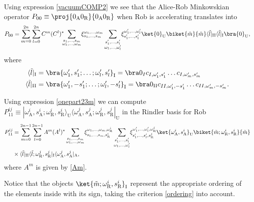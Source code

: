 Using expression \eqref{vacuumCOMP2} we see that the Alice-Rob Minkowskian operator $P_{00}\equiv\proj{0_\text{A}0_\text{R}}{0_\text{A}0_\text{R}}$ when Rob is accelerating translates into
\begin{equation}\label{0000}
 P_{00}=\sum_{m=0}^{2n}\sum_{l=0}^{2n}C^m (C^{l})^*\!\!\!\sum_{\substack{s_1,\dots,s_m\\\omega_1,\dots,\omega_m}}\!\xi_{s_1,\dots,s_m}^{\omega_1,\dots,\omega_m}\sum_{\substack{s'_1,\dots,s'_{l}\\\omega_1,\dots,\omega'_{l}}}\!\xi_{s'_1,\dots,s'_l}^{\omega'_1,\dots,\omega'_l}\ket{0}_{\text{U}}\biket{\tilde m}{\tilde m}\langle{\tilde l}|_{\text{II}}\langle{\tilde l}|_{\text{I}}\bra{0}_{\text{U}},
\end{equation}
where
\begin{align}
\nonumber\langle{\tilde l}|_{\text{I}}&=\bra{\omega'_1,s'_1;\dots; \omega'_l,s'_l}_\text{I}=\bra0_I c_{I,\omega'_1,s'_1}\dots c_{I,\omega'_m,s'_m}\\*
\langle{\tilde l}|_{\text{II}}&=\bra{\omega'_1,-s'_1;\dots; \omega'_l,-s'_l}_\text{I}=\bra0_{\text{II}} c_{II,\omega'_1,-s'_1}\dots c_{II,\omega'_m,-s'_m}.
\end{align}

Using expression \eqref{onepart23m} we can compute $P_{11}^{ij}\equiv | \omega^i_\text{A},s^i_\text{A};\omega^i_\text{R},s^i_\text{R}\rangle_\text{U}\langle \omega^j_\text{A},s^j_\text{A};\omega^j_\text{R},s^j_\text{R}|_\text{U}$ in the Rindler basis for Rob
\begin{align}\label{1111}
 \nonumber P_{11}^{ij}&=\sum_{m=0}^{2n-1}\sum_{l=0}^{2n-1}A^m(A^l)^*\sum_{\substack{s_1,\dots,s_m\\\omega_1,\dots,\omega_m}}\!\xi_{s_1,\dots,s_m,s^i_\text{R}}^{\omega_1,\dots,\omega_m,\omega^i_\text{R}}\sum_{\substack{s'_1,\dots,s'_{l}\\\omega_1,\dots,\omega'_{l}}}\!\xi_{s'_1,\dots,s'_l,s^j_\text{R}}^{\omega'_1,\dots,\omega'_l,\omega^j_\text{R}} \ket{\omega^i_\text{A},s^i_\text{A}}_{\text{U}}\biket{\tilde m;\omega^i_\text{R},s^i_\text{R}}{\tilde m}\\*
 &\times\langle \tilde l|_{\text{II}}\langle \tilde l;\omega^j_\text{R},s^j_\text{R}|_\text{I}\langle{\omega^j_\text{A},s^j_\text{A}}|_\text{A},
\end{align}
where $A^m$ is given by \eqref{Am}.

Notice that the objects $\ket{\tilde m;\omega^i_\text{R},s^i_\text{R}}_\text{I}$ represent the appropriate ordering of the elements inside with its sign, taking the criterion \eqref{ordering} into account.

